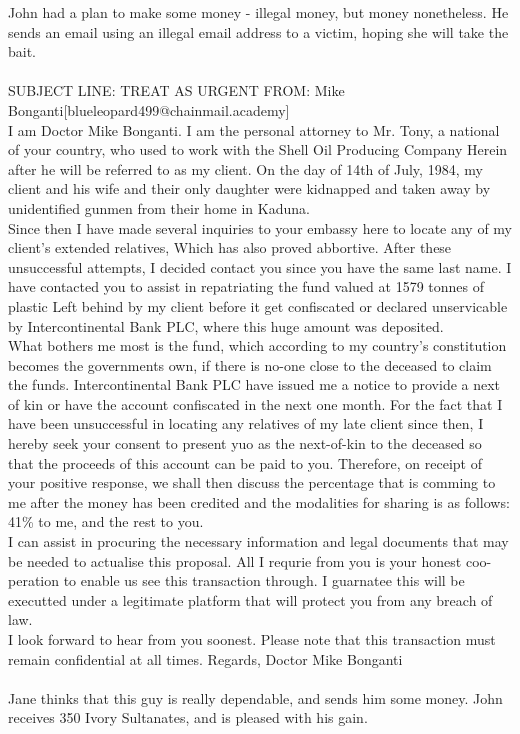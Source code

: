 \documentclass{article}
\begin{document}
John had a plan to make some money {-} illegal money, but money nonetheless.
He sends an email using an illegal email address to a victim, hoping she will take the bait.
\\\\
SUBJECT LINE: TREAT AS URGENT
FROM: Mike Bonganti[blueleopard499@chainmail.academy]
\\
I am Doctor Mike Bonganti.
I am the personal attorney to Mr. Tony, a national of your country, who used to work with the Shell Oil Producing Company
Herein after he will be referred to as my client.
On the day of 14th of July, 1984, my client and his wife and their only daughter were kidnapped and taken away by unidentified gunmen from their home in Kaduna.
\\
Since then I have made several inquiries to your embassy here to locate any of my client's extended relatives, Which has also proved abbortive.
After these unsuccessful attempts, I decided contact you since you have the same last name.
I have contacted you to assist in repatriating the fund valued at 1579 tonnes of plastic Left behind by my client before it get confiscated or declared unservicable by Intercontinental Bank PLC, where this huge amount was deposited.
\\
What bothers me most is the fund, which according to my country's constitution becomes the governments own, if there is no{-}one close to the deceased to claim the funds.
Intercontinental Bank PLC have issued me a notice to provide a next of kin or have the account confiscated in the next one month.
For the fact that I have been unsuccessful in locating any relatives of my late client since then, I hereby seek your consent to present yuo as the next{-}of{-}kin to the deceased so that the proceeds of this account can be paid to you.
Therefore, on receipt of your positive response, we shall then discuss the percentage that is comming to me after the money has been credited and the modalities for sharing is as follows: 41\% to me, and the rest to you.
\\
I can assist in procuring the necessary information and legal documents that may be needed to actualise this proposal.
All I requrie from you is your honest coo{-}peration to enable us see this transaction through.
I guarnatee this will be executted under a legitimate platform that will protect you from any breach of law.
\\
I look forward to hear from you soonest.
Please note that this transaction must remain confidential at all times.
Regards, Doctor Mike Bonganti
\\\\
Jane thinks that this guy is really dependable, and sends him some money.
John receives 350 Ivory Sultanates, and is pleased with his gain.
\end{document}

